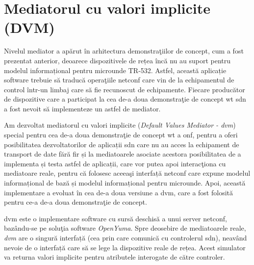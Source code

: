 \chapter{Mediatorul cu valori implicite (DVM)\label{ch:dvm_v01}}

\graphicspath{ {cap-dvm_v01/figures/} }

Nivelul mediator a apărut în arhitectura demonstraţiilor de concept, cum a fost prezentat anterior, deoarece dispozitivele de rețea încă nu au suport pentru modelul informațional pentru microunde TR-532. Astfel, această aplicație software trebuie să traducă operaţiile \gls{netconf} care vin de la echipamentul de control într-un limbaj care să fie recunoscut de echipamente. Fiecare producător de dispozitive care a participat la cea de-a doua demonstraţie de concept \gls{wt} \gls{sdn} a fost nevoit să implementeze un astfel de mediator.

Am dezvoltat mediatorul cu valori implicite (\textit{Default Values Mediator - \gls{dvm}}) special pentru cea de-a doua demonstraţie de concept \gls{wt} a \gls{onf}, pentru a oferi posibilitatea dezvoltatorilor de aplicații \gls{sdn} care nu au acces la echipament de transport de date fără fir și la mediatoarele asociate acestora posibilitatea de a implementa și testa astfel de aplicații, care vor putea apoi interacţiona cu mediatoare reale, pentru că folosesc aceeaşi interfață \gls{netconf} care expune modelul informațional de bază și modelul informațional pentru microunde. Apoi, această implementare a evoluat în cea de-a doua versiune a \gls{dvm}, care a fost folosită pentru ce-a de-a doua demonstraţie de concept.

\gls{dvm} este o implementare software cu sursă deschisă a unui server \gls{netconf}, bazându-se pe soluţia software \textit{OpenYuma}. Spre deosebire de mediatoarele reale, \textit{\gls{dvm}} are o singură interfață (cea prin care comunică cu controlerul \gls{sdn}), neavând nevoie de o interfață care să se lege la dispozitive reale de rețea. Acest simulator va returna valori implicite pentru atributele interogate de către controler.







